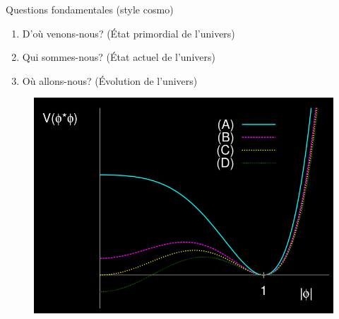\documentclass[handout]{beamer}
\begin{document}
\begin{frame}
\begin{block}{Questions fondamentales (style cosmo)}
\begin{enumerate}
\item D'où venons-nous? (État primordial de l'univers)
\item Qui sommes-nous? (État actuel de l'univers)
\item Où allons-nous? (Évolution de l'univers)
\end{enumerate}
\end{block}
\begin{figure}[0.5\textwidth]
  \includegraphics[scale=0.25]{evo_pot.png}
 \end{figure}
\end{frame}


\end{document}
